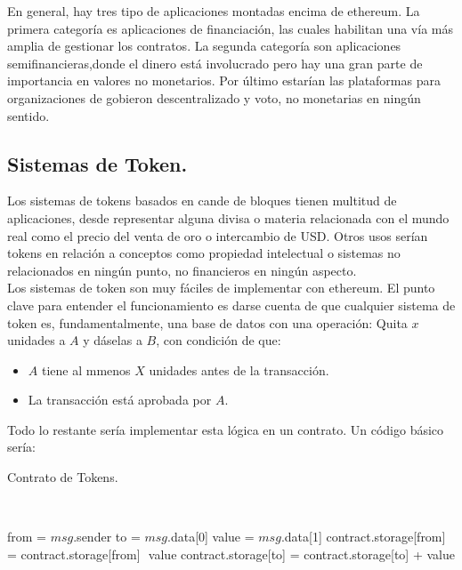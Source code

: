 \documentclass[11pt,a4paper]{article}
\begin{document}
En general, hay tres tipo de aplicaciones montadas encima de ethereum. La primera categoría es aplicaciones de financiación, las cuales habilitan una vía más amplia de gestionar los contratos. La segunda categoría son aplicaciones semifinancieras,donde el dinero está involucrado pero hay una gran parte de importancia en valores no monetarios. Por último estarían las plataformas para organizaciones de gobieron descentralizado y voto, no monetarias en ningún sentido.

\subsection{Sistemas de Token.}

Los sistemas de tokens basados en cande de bloques tienen multitud de aplicaciones, desde representar alguna divisa o materia relacionada con el mundo real como el precio del venta de oro o intercambio de USD. Otros usos serían tokens en relación a conceptos como propiedad intelectual o sistemas no relacionados en ningún punto, no financieros en ningún aspecto. \\

Los sistemas de token son muy fáciles de implementar con ethereum. El punto clave para entender el funcionamiento es darse cuenta de que cualquier sistema de token es, fundamentalmente, una base de datos con una operación: Quita $x$ unidades a $A$ y dáselas a $B$, con condición de que:
\begin{itemize}
\item $A$ tiene al mmenos $X$ unidades antes de la transacción.
\item La transacción está aprobada por $A$. 
\end{itemize}

Todo lo restante sería implementar esta lógica en un contrato. Un código básico sería:\\


\begin{algorithm}
  \caption{Contrato de Tokens.}\label{token}
  \begin{algorithmic}[1]
    			\\ 
    
    \State from = $msg$.sender
    \State to = $msg$.data[0]
    \State value = $msg$.data[1]
    \State contract.storage[from] = contract.storage[from] ­ value
    \State contract.storage[to] = contract.storage[to] + value
    \EndIf
    \EndProcedure
  \end{algorithmic}
\end{algorithm}
\end{document}
